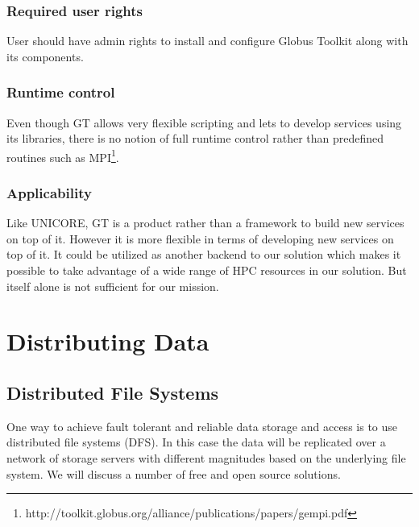 \subsubsection {Required user rights}
User should have admin rights to install and configure Globus Toolkit along with its components.
\subsubsection {Runtime control}
Even though GT allows very flexible scripting and lets to develop services using its libraries, there is no notion
of full runtime control rather than predefined routines such 
as MPI\footnote{http://toolkit.globus.org/alliance/publications/papers/gempi.pdf}.
\subsubsection {Applicability}
Like UNICORE, GT is a product rather than a framework to build new services on top of it. However it is more flexible
in terms of developing new services on top of it. It could be utilized as another backend to our solution which makes it
possible to take advantage of a wide range of HPC resources in our solution. But itself alone is not sufficient for 
our mission.

\section{Distributing Data}

\subsection{Distributed File Systems}
One way to achieve fault tolerant and reliable data storage and access is to use
distributed file systems (DFS). In this case the data will be replicated over a
network of storage servers with different magnitudes based on the underlying file
system. We will discuss a number of free and open source solutions.

